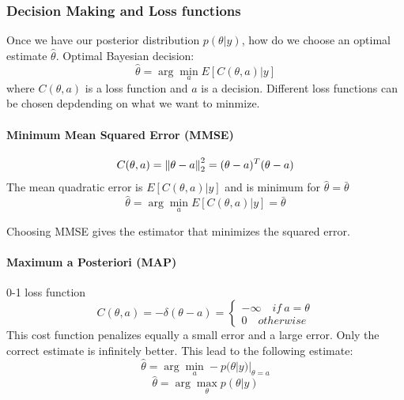 \subsubsection{Decision Making and Loss functions}
Once we have our posterior distribution $p(\theta|y)$, how do we choose an optimal estimate $\hat{\theta}$. Optimal Bayesian decision:
\begin{equation}
    \hat{\theta} = \arg\min_{a} E[C(\theta, a) | y]
\end{equation}
where $C(\theta, a)$ is a loss function and $a$ is a decision. Different loss functions can be chosen depdending on what we want to minmize. 

\paragraph{Minimum Mean Squared Error (MMSE)}
\begin{equation}
    C(\theta, a) = \left\lVert\theta-a\right\rVert^2_2 = (\theta-a)^T(\theta-a)
\end{equation}
The mean quadratic error is $E[C(\theta, a)|y]$ and is minimum for $\hat{\theta}=\bar{\theta}$
\begin{equation}
    \hat{\theta} = \arg\min_{a} E[C(\theta, a)|y] = \bar{\theta}
\end{equation}

Choosing MMSE gives the estimator that minimizes the squared error.

\paragraph{Maximum a Posteriori (MAP)}
0-1 loss function
\begin{equation}
    C(\theta, a) = -\delta(\theta-a) = \left\{\begin{array}{c}
        -\infty \quad if \: a=\theta  \\   
        0 \quad otherwise
    \end{array}\right.
\end{equation}
This cost function penalizes equally a small error and a large error. Only the correct estimate is infinitely better. This lead to the following estimate:
\begin{equation}
    \hat{\theta} = \arg\min_{a} -p(\theta|y) |_ {\theta=a}
\end{equation}
\begin{equation}
    \hat{\theta} = \arg\max_{\theta} p(\theta|y)
\end{equation}

